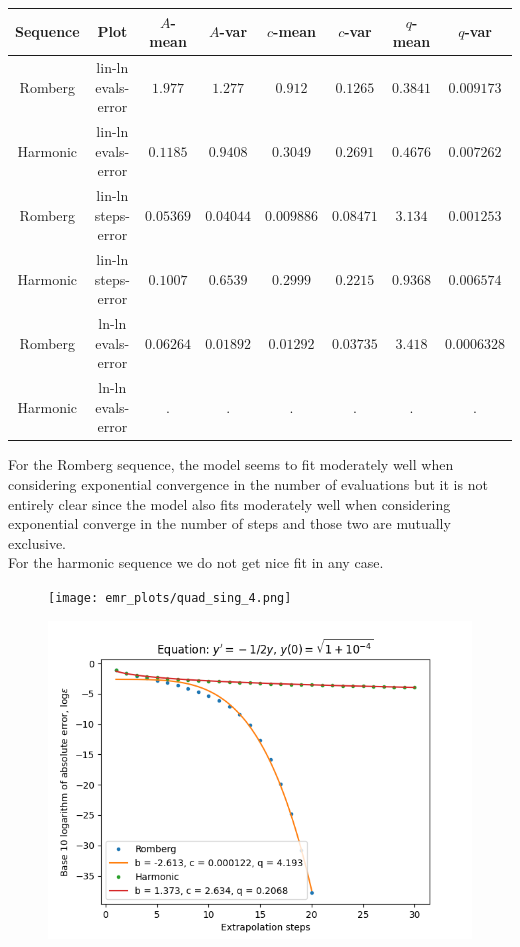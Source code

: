 \begin{table}[H]
    \centering
    \small
    \begin{tabular}{c|c||c|c|c|c|c|c}
Sequence & Plot & \(A\)-mean & \(A\)-var & \(c\)-mean & \(c\)-var & \(q\)-mean & \(q\)-var\\\hline
Romberg & lin-ln evals-error & \(1.977\) & \(1.277\) & \(0.912\) & \(0.1265\) & \(0.3841\) & \(0.009173\) \\
Harmonic & lin-ln evals-error & \(0.1185\) & \(0.9408\) & \(0.3049\) & \(0.2691\) & \(0.4676\) & \(0.007262\) \\
Romberg & lin-ln steps-error & \(0.05369\) & \(0.04044\) & \(0.009886\) & \(0.08471\) & \(3.134\) & \(0.001253\) \\
Harmonic & lin-ln steps-error & \(0.1007\) & \(0.6539\) & \(0.2999\) & \(0.2215\) & \(0.9368\) & \(0.006574\) \\
Romberg & ln-ln evals-error & \(0.06264\) & \(0.01892\) & \(0.01292\) & \(0.03735\) & \(3.418\) & \(0.0006328\) \\
Harmonic & ln-ln evals-error & . & . & . & . & . & . \\
    \end{tabular}
    \label{tab:my_label}
\end{table}

For the Romberg sequence, the model seems to fit moderately well when considering exponential convergence in the number of evaluations but it is not entirely clear since the model also fits moderately well when considering exponential converge in the number of steps and those two are mutually exclusive.\\

For the harmonic sequence we do not get nice fit in any case.

\begin{figure}[H]
\centering
\begin{minipage}{0.45\textwidth}
\centering
\texttt{[image: emr\_plots/quad\_sing\_4.png]}
\end{minipage}
\begin{minipage}{0.45\textwidth}
\centering
\includegraphics[scale=0.45]{emr_plots/quad_sing_4_hp_steps.png}
\end{minipage}
\end{figure}


